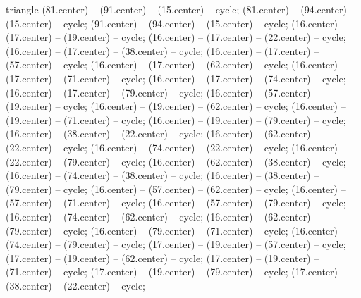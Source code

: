 \begin{pgfonlayer}{triangle}
 (81.center) -- (91.center) -- (15.center) -- cycle; 
 (81.center) -- (94.center) -- (15.center) -- cycle; 
 (91.center) -- (94.center) -- (15.center) -- cycle; 
 (16.center) -- (17.center) -- (19.center) -- cycle; 
 (16.center) -- (17.center) -- (22.center) -- cycle; 
 (16.center) -- (17.center) -- (38.center) -- cycle; 
 (16.center) -- (17.center) -- (57.center) -- cycle; 
 (16.center) -- (17.center) -- (62.center) -- cycle; 
 (16.center) -- (17.center) -- (71.center) -- cycle; 
 (16.center) -- (17.center) -- (74.center) -- cycle; 
 (16.center) -- (17.center) -- (79.center) -- cycle; 
 (16.center) -- (57.center) -- (19.center) -- cycle; 
 (16.center) -- (19.center) -- (62.center) -- cycle; 
 (16.center) -- (19.center) -- (71.center) -- cycle; 
 (16.center) -- (19.center) -- (79.center) -- cycle; 
 (16.center) -- (38.center) -- (22.center) -- cycle; 
 (16.center) -- (62.center) -- (22.center) -- cycle; 
 (16.center) -- (74.center) -- (22.center) -- cycle; 
 (16.center) -- (22.center) -- (79.center) -- cycle; 
 (16.center) -- (62.center) -- (38.center) -- cycle; 
 (16.center) -- (74.center) -- (38.center) -- cycle; 
 (16.center) -- (38.center) -- (79.center) -- cycle; 
 (16.center) -- (57.center) -- (62.center) -- cycle; 
 (16.center) -- (57.center) -- (71.center) -- cycle; 
 (16.center) -- (57.center) -- (79.center) -- cycle; 
 (16.center) -- (74.center) -- (62.center) -- cycle; 
 (16.center) -- (62.center) -- (79.center) -- cycle; 
 (16.center) -- (79.center) -- (71.center) -- cycle; 
 (16.center) -- (74.center) -- (79.center) -- cycle; 
 (17.center) -- (19.center) -- (57.center) -- cycle; 
 (17.center) -- (19.center) -- (62.center) -- cycle; 
 (17.center) -- (19.center) -- (71.center) -- cycle; 
 (17.center) -- (19.center) -- (79.center) -- cycle; 
 (17.center) -- (38.center) -- (22.center) -- cycle; 

\end{pgfonlayer}
